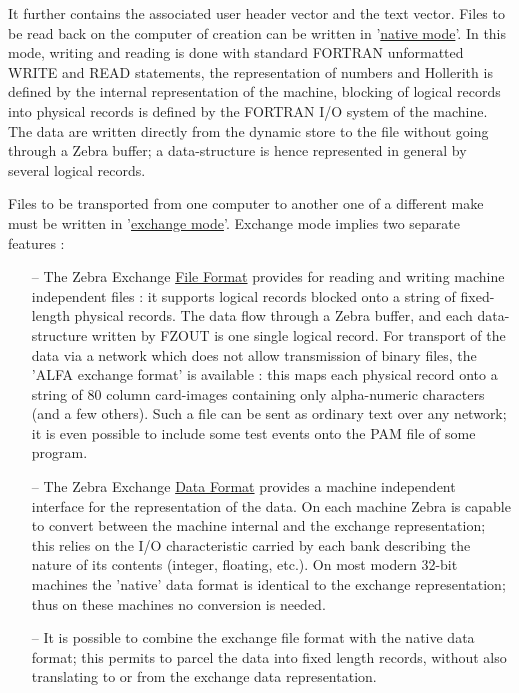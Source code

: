 It further contains the associated user header vector
and the text vector.
Files to be read back on the computer of creation can be written in
'\underline{native mode}'.
In this mode, writing and reading is done with standard FORTRAN
unformatted WRITE and READ statements,
the representation of numbers and Hollerith is defined by the
internal representation of the machine,
blocking of logical records into physical records is defined by the
FORTRAN I/O system of the machine.
The data are written directly from the dynamic store to the file
without going through a Zebra buffer;
a data-structure is hence represented in general by several
logical records.
\par
Files to be transported from one computer to another one of a
different make must be written in
'\underline{exchange mode}'.
Exchange mode implies two separate features :
\begin{itemize}
 \item[--] The Zebra Exchange \underline{File Format}
 provides for reading and writing machine independent files :
 it supports logical records blocked
 onto a string of fixed-length physical records.
 The data flow through a Zebra buffer,
 and each data-structure written by FZOUT is one single logical record.
 For transport of the data via a network which does not allow
 transmission of binary files, the 'ALFA exchange format' is available :
 this maps each physical record onto a string of 80 column card-images
 containing only alpha-numeric characters (and a few others).
 Such a file can be sent as ordinary text over any network;
 it is even possible to include some test events onto the
 PAM file of some program.
 \item[--] The Zebra Exchange \underline{Data Format}
 provides a machine independent interface for the representation
 of the data.
 On each machine Zebra is capable to convert between the
 machine internal and the exchange representation;
 this relies on the I/O characteristic carried by each bank describing
 the nature of its contents (integer, floating, etc.).
 On most modern 32-bit machines the 'native' data format is identical
 to the exchange representation;
 thus on these machines no conversion is needed.
 \item[--] It is possible to combine the exchange file format
 with the native data format;
 this permits to parcel the data into fixed length records,
 without also translating to or from the exchange data
 representation.
\end{itemize}
\par
